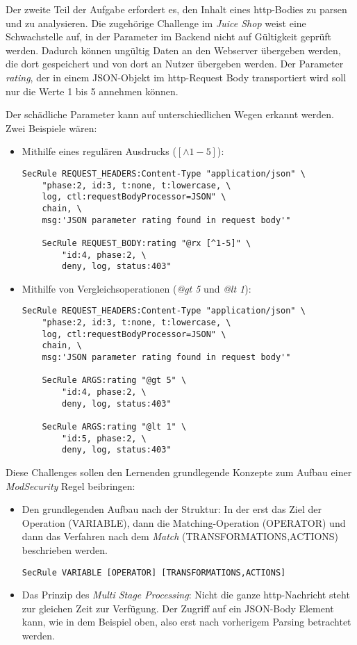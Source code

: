 Der zweite Teil der Aufgabe erfordert es, den Inhalt eines \ac{http}-Bodies zu parsen und zu analysieren.
Die zugehörige Challenge im \textit{Juice Shop} weist eine Schwachstelle auf, in der Parameter im Backend nicht auf Gültigkeit geprüft werden.
Dadurch können ungültig Daten an den Webserver übergeben werden, die dort gespeichert und von dort an Nutzer übergeben werden.
Der Parameter \textit{rating}, der in einem JSON-Objekt im \ac{http}-Request Body transportiert wird soll nur die Werte 1 bis 5 annehmen können.

Der schädliche Parameter kann auf unterschiedlichen Wegen erkannt werden.
Zwei Beispiele wären:\\

\begin{itemize}
    \item Mithilfe eines regulären Ausdrucks ($[\land 1-5]$):

    \begin{lstlisting}
SecRule REQUEST_HEADERS:Content-Type "application/json" \
    "phase:2, id:3, t:none, t:lowercase, \
    log, ctl:requestBodyProcessor=JSON" \
    chain, \
    msg:'JSON parameter rating found in request body'"

    SecRule REQUEST_BODY:rating "@rx [^1-5]" \
        "id:4, phase:2, \
        deny, log, status:403"
    \end{lstlisting}

    \item Mithilfe von Vergleichsoperationen (\textit{@gt 5} und \textit{@lt 1}):
    \begin{lstlisting}
SecRule REQUEST_HEADERS:Content-Type "application/json" \
    "phase:2, id:3, t:none, t:lowercase, \
    log, ctl:requestBodyProcessor=JSON" \
    chain, \
    msg:'JSON parameter rating found in request body'"
    
    SecRule ARGS:rating "@gt 5" \
        "id:4, phase:2, \
        deny, log, status:403"

    SecRule ARGS:rating "@lt 1" \
        "id:5, phase:2, \
        deny, log, status:403"
    \end{lstlisting}
\end{itemize}

Diese Challenges sollen den Lernenden grundlegende Konzepte zum Aufbau einer \textit{ModSecurity} Regel beibringen:
\begin{itemize}
    \item Den grundlegenden Aufbau nach der Struktur:
    In der erst das Ziel der Operation (VARIABLE), dann die Matching-Operation (OPERATOR) und dann das Verfahren nach dem \textit{Match} (TRANSFORMATIONS,ACTIONS) beschrieben werden.
    \begin{verbatim}
SecRule VARIABLE [OPERATOR] [TRANSFORMATIONS,ACTIONS]
    \end{verbatim}
    \item Das Prinzip des \textit{Multi Stage Processing}: Nicht die ganze \ac{http}-Nachricht steht zur gleichen Zeit zur Verfügung. Der Zugriff auf ein JSON-Body Element kann, wie in dem Beispiel oben, also erst nach vorherigem Parsing betrachtet werden.
\end{itemize}

